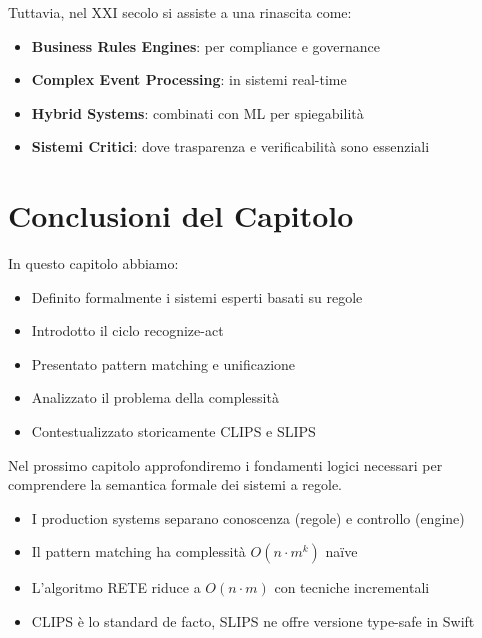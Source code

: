 Tuttavia, nel XXI secolo si assiste a una rinascita come:
\begin{itemize}
\item \textbf{Business Rules Engines}: per compliance e governance
\item \textbf{Complex Event Processing}: in sistemi real-time
\item \textbf{Hybrid Systems}: combinati con ML per spiegabilità
\item \textbf{Sistemi Critici}: dove trasparenza e verificabilità sono essenziali
\end{itemize}

\section{Conclusioni del Capitolo}

In questo capitolo abbiamo:

\begin{itemize}
\item Definito formalmente i sistemi esperti basati su regole
\item Introdotto il ciclo recognize-act
\item Presentato pattern matching e unificazione
\item Analizzato il problema della complessità
\item Contestualizzato storicamente CLIPS e SLIPS
\end{itemize}

Nel prossimo capitolo approfondiremo i fondamenti logici necessari per comprendere la semantica formale dei sistemi a regole.

\vspace{1cm}

\begin{successbox}
\begin{itemize}
\item I production systems separano conoscenza (regole) e controllo (engine)
\item Il pattern matching ha complessità $O(n \cdot m^k)$ naïve
\item L'algoritmo RETE riduce a $O(n \cdot m)$ con tecniche incrementali
\item CLIPS è lo standard de facto, SLIPS ne offre versione type-safe in Swift
\end{itemize}
\end{successbox}


